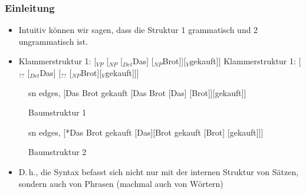 \begin{frame}
\frametitle{Einleitung}

\begin{itemize}

	\item Intuitiv können wir sagen, dass die Struktur 1 grammatisch und 2 ungrammatisch ist.
	\item[]
	\eal
	\ex Klammerstruktur 1: [$_{VP}$ [$_{NP}$ [$_{Det}$Das] [$_{NP}$Brot]][$_{V}$gekauft]]
	\ex Klammerstruktur 1: [$_{??}$ [$_{Det}$Das] [$_{??}$ [$_{NP}$Brot][$_{V}$gekauft]]]
	\zl

\end{itemize}


\begin{figure}[b]
	\begin{minipage}[b]{0.05\textwidth}
	\end{minipage} 
	\begin{minipage}[b]{0.40\textwidth}
	\centering
	\scriptsize{
		\begin{forest}
		sn edges,
		[Das Brot gekauft [Das Brot [Das] [Brot]][gekauft]]
		\end{forest}
		}
		\caption{Baumstruktur 1}	
  	\end{minipage}  
	\begin{minipage}[b]{0.05\textwidth}
  	\end{minipage}
  	\begin{minipage}[b]{0.40\textwidth}
	\centering
	\scriptsize{
		\begin{forest}
		sn edges,
		[*Das Brot gekauft [Das][Brot gekauft [Brot] [gekauft]]]
		\end{forest}
		}
		\caption{Baumstruktur 2}
  	\end{minipage}  
	\begin{minipage}[b]{0.05\textwidth}
  	\end{minipage}
  	
\end{figure}

\begin{itemize}
	\item D.\,h., die Syntax befasst sich nicht nur mit der internen Struktur von Sätzen, sondern auch von Phrasen (machmal auch von Wörtern)
\end{itemize}
\end{frame}


